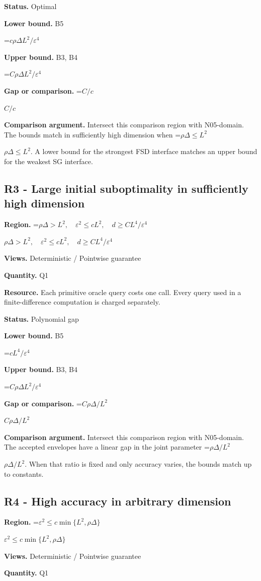 \documentclass[10pt,a4paper]{article}
\newcommand{\AtlasMath}[1]{\par\begingroup\centering\setbox0=\hbox{$\displaystyle #1$}\ifdim\wd0>1.4\linewidth\typeout{ATLAS WIDE FORMULA: \the\wd0}\fi\ifdim\wd0>\linewidth\resizebox{\linewidth}{!}{\box0}\else\box0\fi\par\endgroup}
\newcommand{\AtlasInlineMath}[1]{\begingroup\setbox0=\hbox{$#1$}\ifdim\wd0>.4\linewidth\endgroup\AtlasMath{#1}\else\endgroup$#1$\fi}
\begin{document}
\textbf{Status.} Optimal

\textbf{Lower bound.} B5

\AtlasMath{c\rho\Delta L^2/\varepsilon^4}
\textbf{Upper bound.} B3, B4

\AtlasMath{C\rho\Delta L^2/\varepsilon^4}
\textbf{Gap or comparison.} \AtlasInlineMath{C/c}

\textbf{Comparison argument.} Intersect this comparison region with N05-domain. The bounds match in sufficiently high dimension when \AtlasInlineMath{\rho\Delta\le L^2}. A lower bound for the strongest FSD interface matches an upper bound for the weakest SG interface.

\subsection{R3 - Large initial suboptimality in sufficiently high dimension}
\textbf{Region.} \AtlasInlineMath{\rho\Delta>L^2,\quad\varepsilon^2\le cL^2,\quad d\ge CL^4/\varepsilon^4}

\textbf{Views.} Deterministic / Pointwise guarantee

\textbf{Quantity.} Q1

\textbf{Resource.} Each primitive oracle query costs one call. Every query used in a finite-difference computation is charged separately.

\textbf{Status.} Polynomial gap

\textbf{Lower bound.} B5

\AtlasMath{cL^4/\varepsilon^4}
\textbf{Upper bound.} B3, B4

\AtlasMath{C\rho\Delta L^2/\varepsilon^4}
\textbf{Gap or comparison.} \AtlasInlineMath{C\rho\Delta/L^2}

\textbf{Comparison argument.} Intersect this comparison region with N05-domain. The accepted envelopes have a linear gap in the joint parameter \AtlasInlineMath{\rho\Delta/L^2}. When that ratio is fixed and only accuracy varies, the bounds match up to constants.

\subsection{R4 - High accuracy in arbitrary dimension}
\textbf{Region.} \AtlasInlineMath{\varepsilon^2\le c\min\{L^2,\rho\Delta\}}

\textbf{Views.} Deterministic / Pointwise guarantee

\textbf{Quantity.} Q1
\end{document}
